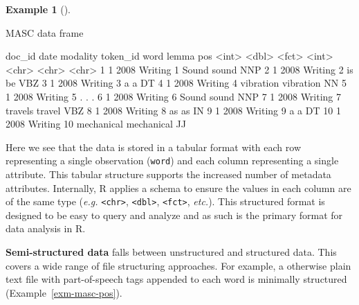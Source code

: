 \documentclass[
  letterpaper,
]{latex/krantz}
\newenvironment{Shaded}{\begin{snugshade}}{\end{snugshade}}
\newcommand{\KeywordTok}[1]{\textcolor[rgb]{0.00,0.00,0.00}{#1}}
\newcommand{\NormalTok}[1]{\textcolor[rgb]{0.00,0.00,0.00}{#1}}
\theoremstyle{definition}
\newtheorem{example}{Example}[chapter]
\theoremstyle{remark}
\begin{document}
\begin{example}[]\protect\hypertarget{exm-masc-df}{}\label{exm-masc-df}

MASC data frame

\begin{Shaded}
\begin{Highlighting}[]
\NormalTok{   doc\_id  date modality token\_id word       lemma      pos}
\NormalTok{    \textless{}}\KeywordTok{int}\NormalTok{\textgreater{} \textless{}}\KeywordTok{dbl}\NormalTok{\textgreater{} \textless{}}\KeywordTok{fct}\NormalTok{\textgreater{}       \textless{}}\KeywordTok{int}\NormalTok{\textgreater{} \textless{}}\KeywordTok{chr}\NormalTok{\textgreater{}      \textless{}}\KeywordTok{chr}\NormalTok{\textgreater{}      \textless{}}\KeywordTok{chr}\NormalTok{\textgreater{}}
\NormalTok{ 1      1  2008 Writing         1 Sound      sound      NNP}
\NormalTok{ 2      1  2008 Writing         2 is         be         VBZ}
\NormalTok{ 3      1  2008 Writing         3 a          a          DT}
\NormalTok{ 4      1  2008 Writing         4 vibration  vibration  NN}
\NormalTok{ 5      1  2008 Writing         5 .          .          .}
\NormalTok{ 6      1  2008 Writing         6 Sound      sound      NNP}
\NormalTok{ 7      1  2008 Writing         7 travels    travel     VBZ}
\NormalTok{ 8      1  2008 Writing         8 as         as         IN}
\NormalTok{ 9      1  2008 Writing         9 a          a          DT}
\NormalTok{10      1  2008 Writing        10 mechanical mechanical JJ}
\end{Highlighting}
\end{Shaded}

\end{example}

Here we see that the data is stored in a tabular format with each row
representing a single observation (\texttt{word}) and each column
representing a single attribute. This tabular structure supports the
increased number of metadata attributes. Internally, R applies a schema
to ensure the values in each column are of the same type (\emph{e.g.}
\texttt{\textless{}chr\textgreater{}},
\texttt{\textless{}dbl\textgreater{}},
\texttt{\textless{}fct\textgreater{}}, \emph{etc.}). This structured
format is designed to be easy to query and analyze and as such is the
primary format for data analysis in R.

\textbf{Semi-structured data} falls between unstructured and structured
data. This covers a wide range of file structuring approaches. For
example, a otherwise plain text file with part-of-speech tags appended
to each word is minimally structured (Example~\ref{exm-masc-pos}).
\end{document}
